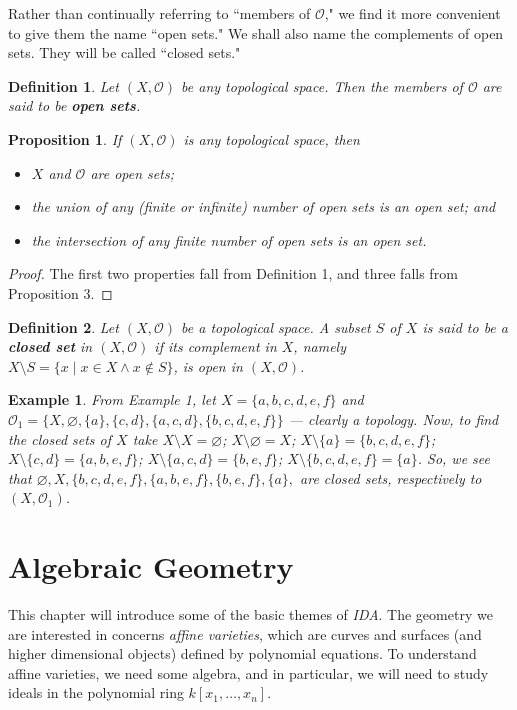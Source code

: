 \documentclass[12pt,reqno]{amsart}
\theoremstyle{plain}
\newtheorem{defi}{Definition}
\newtheorem{prop}{Proposition}
\newtheorem{ex}{Example}
\newcommand{\oo}{\mathcal{O}}
\begin{document}
Rather than continually referring to ``members of $\oo$," we find it more convenient to give them the name ``open sets." We shall also name the complements of open sets. They will be called ``closed sets." 
\begin{defi} Let $(X, \oo)$ be any topological space. Then the members of $\oo$ are said to be \textup{\textbf{open sets}}. 
\end{defi} 
\begin{prop} If $(X, \oo)$ is any topological space, then 
\begin{itemize}
\item [\textup{(i)}] $X$ and $\oo$ are open sets;
\item [\textup{(ii)}] the union of any (finite or infinite) number of open sets is an open set; and 
\item [\textup{(iii)}] the intersection of any finite number of open sets is an open set. 
\end{itemize}
\end{prop} 
\begin{proof} The first two properties fall from Definition 1, and three falls from Proposition 3.
\end{proof}
\begin{defi} Let $(X, \oo)$ be a topological space. A subset $S$ of $X$ is said to be a \textup{\textbf{closed set}} in $(X, \oo)$ if its complement in $X$, namely $X \setminus S = \{ x \mid x \in X \wedge x \notin S \}$, is open in $(X, \oo)$. 
\end{defi} 
\begin{ex} From Example 1, let $X = \{a, b, c, d, e, f \}$ and $\mathcal{O}_1 = \{ X, \varnothing, \{a \}, \{c,d \}, \{a, c, d \}, \{b, c, d, e, f \} \}$ — clearly a topology. Now, to find the closed sets of $X$ take $X \setminus X = \varnothing$; $X \setminus \varnothing = X$; $X \setminus \{a \} = \{b, c, d, e, f \}$; $X \setminus \{ c, d \} = \{a, b, e, f \}$; $X \setminus \{a, c, d \} = \{b, e, f \}$; $X \setminus \{b, c, d, e, f \} = \{a \}$. So, we see that $\varnothing, X, \{b, c, d, e, f \}, \{a, b, e, f \}, \{b, e, f \}, \{ a \}, $ are closed sets, respectively to $(X, \oo_1)$.
\end{ex} 
\newpage 
\section{Algebraic Geometry}
This chapter will introduce some of the basic themes of \textit{IDA}. The geometry we are interested in concerns \textit{affine varieties}, which are curves and surfaces (and higher dimensional objects) defined by polynomial equations. To understand affine varieties, we need some algebra, and in particular, we will need to study ideals in the polynomial ring $k [x_1, \ldots, x_n]$. 
\end{document}
